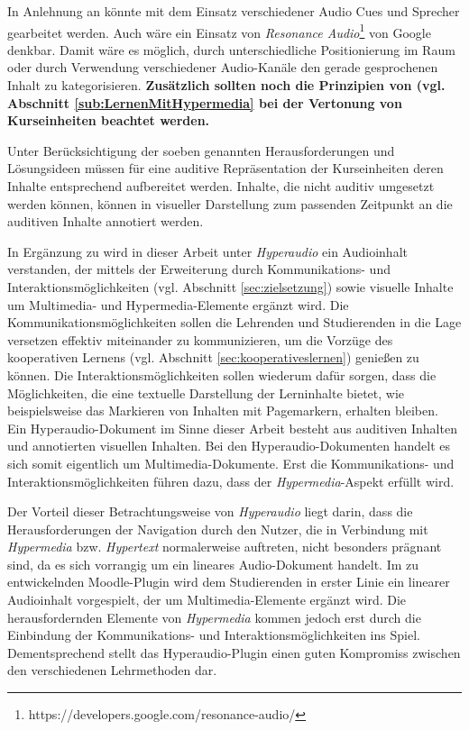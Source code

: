 In Anlehnung an \cite{donker2007gestaltung} könnte mit dem Einsatz verschiedener Audio Cues und Sprecher gearbeitet werden. Auch wäre ein Einsatz von \textit{Resonance Audio}\footnote{https://developers.google.com/resonance-audio/} von Google denkbar. Damit wäre es möglich, durch unterschiedliche Positionierung im Raum oder durch Verwendung verschiedener Audio-Kanäle den gerade gesprochenen Inhalt zu kategorisieren.\textbf{ Zusätzlich sollten noch die Prinzipien von \cite{mayer2009multimedia} (vgl. Abschnitt \ref{sub:LernenMitHypermedia} bei der Vertonung von Kurseinheiten beachtet werden.}


Unter Berücksichtigung der soeben genannten Herausforderungen und Lösungsideen müssen für eine auditive Repräsentation der Kurseinheiten deren Inhalte entsprechend aufbereitet werden. Inhalte, die nicht auditiv umgesetzt werden können, können in visueller Darstellung zum passenden Zeitpunkt an die auditiven Inhalte annotiert werden.

In Ergänzung zu \cite{zumbach2006learning} wird in dieser Arbeit unter \textit{Hyperaudio} ein Audioinhalt verstanden, der mittels der Erweiterung durch Kommunikations- und Interaktionsmöglichkeiten (vgl. Abschnitt \ref{sec:zielsetzung}) sowie visuelle Inhalte um Multimedia- und Hypermedia-Elemente ergänzt wird. Die Kommunikationsmöglichkeiten sollen die Lehrenden und Studierenden in die Lage versetzen effektiv miteinander zu kommunizieren, um die Vorzüge des kooperativen Lernens (vgl. Abschnitt \ref{sec:kooperativeslernen}) genießen zu können. Die Interaktionsmöglichkeiten sollen wiederum dafür sorgen, dass die Möglichkeiten, die eine textuelle Darstellung der Lerninhalte bietet, wie beispielsweise das Markieren von Inhalten mit Pagemarkern, erhalten bleiben.\\
Ein Hyperaudio-Dokument im Sinne dieser Arbeit besteht aus auditiven Inhalten und annotierten visuellen Inhalten. Bei den Hyperaudio-Dokumenten handelt es sich somit eigentlich um Multimedia-Dokumente. Erst die Kommunikations- und Interaktionsmöglichkeiten führen dazu, dass der \textit{Hypermedia}-Aspekt erfüllt wird.

Der Vorteil dieser Betrachtungsweise von \textit{Hyperaudio} liegt darin, dass die Herausforderungen der Navigation durch den Nutzer, die in Verbindung mit \textit{Hypermedia} bzw. \textit{Hypertext} normalerweise auftreten, nicht besonders prägnant sind, da es sich vorrangig um ein lineares Audio-Dokument handelt. Im zu entwickelnden Moodle-Plugin wird dem Studierenden in erster Linie ein linearer Audioinhalt vorgespielt, der um Multimedia-Elemente ergänzt wird. Die herausfordernden Elemente von \textit{Hypermedia} kommen jedoch erst durch die Einbindung der Kommunikations- und Interaktionsmöglichkeiten ins Spiel. Dementsprechend stellt das Hyperaudio-Plugin einen guten Kompromiss zwischen den verschiedenen Lehrmethoden dar.

